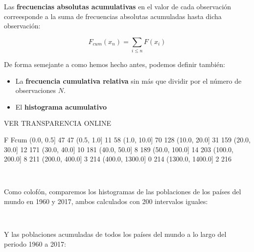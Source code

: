 \documentclass[11pt]{article}
\providecommand{\tightlist}{%
      \setlength{\itemsep}{0pt}\setlength{\parskip}{0pt}}
\begin{document}
Las \textbf{frecuencias absolutas acumulativas} en el valor de cada
observación correesponde a la suma de frecuencias absolutas acumuladas
hasta dicha observación:

\[F_{cum}(x_n) = \sum_{i \leq n} F(x_i)\]

De forma semejante a como hemos hecho antes, podemos definir también:

\begin{itemize}
\tightlist
\item
  La \textbf{frecuencia cumulativa relativa} sin más que dividir por el
  número de observaciones \(N\).
\item
  El \textbf{histograma acumulativo}
\end{itemize}

VER TRANSPARENCIA ONLINE

                   F  Fcum
(0.0, 0.5]        47    47
(0.5, 1.0]        11    58
(1.0, 10.0]       70   128
(10.0, 20.0]      31   159
(20.0, 30.0]      12   171
(30.0, 40.0]      10   181
(40.0, 50.0]       8   189
(50.0, 100.0]     14   203
(100.0, 200.0]     8   211
(200.0, 400.0]     3   214
(400.0, 1300.0]    0   214
(1300.0, 1400.0]   2   216
            
    \begin{center}
    \end{center}
    { \hspace*{\fill} \\}
    
    Como colofón, comparemos los histogramas de las poblaciones de los
países del mundo en 1960 y 2017, ambos calculados con 200 intervalos
iguales:

    \begin{center}
    \end{center}
    { \hspace*{\fill} \\}
    
    Y las poblaciones acumuladas de todos los países del mundo a lo largo
del periodo 1960 a 2017:

    \begin{center}
    \end{center}
    { \hspace*{\fill} \\}
\end{document}

